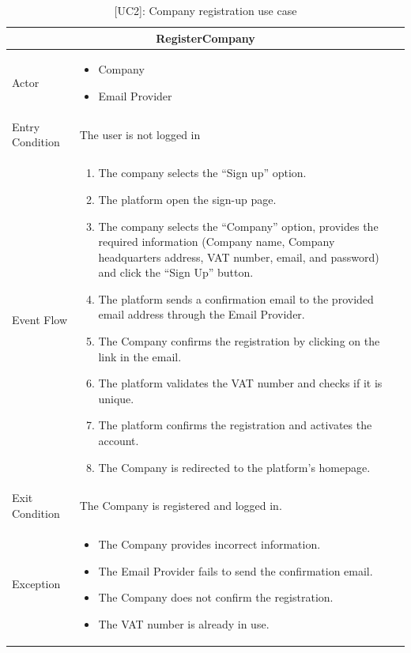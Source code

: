 \clearpage
\begin{table}[H]
    \centering
    \begin{tabular}{|p{3cm}|p{12cm}|}
    \hline
    \multicolumn{2}{|c|}{\textbf{RegisterCompany}} \\ \hline
    Actor & 
    \begin{itemize}
        \item Company
        \item Email Provider
    \end{itemize} \\ \hline
    Entry Condition & The user is not logged in \\ \hline
    Event Flow &
    \begin{enumerate}         
        \item The company selects the “Sign up” option.
        \item The platform open the sign-up page.
        \item The company selects the “Company” option, provides the required information (Company name, Company headquarters address, VAT number, email, and password) and click the “Sign Up” button.
        \item The platform sends a confirmation email to the provided email address through the Email Provider.
        \item The Company confirms the registration by clicking on the link in the email.
        \item The platform validates the VAT number and checks if it is unique.
        \item The platform confirms the registration and activates the account.
        \item The Company is redirected to the platform's homepage.
    \end{enumerate} \\ \hline
    Exit Condition & The Company is registered and logged in. \\ \hline
    Exception & 
    \begin{itemize}
        \item The Company provides incorrect information.
        \item The Email Provider fails to send the confirmation email.
        \item The Company does not confirm the registration.
        \item The VAT number is already in use.
    \end{itemize} \\ \hline
    \end{tabular}
    \caption{[UC2]: Company registration use case}
    \label{tab:UC2}
\end{table}

